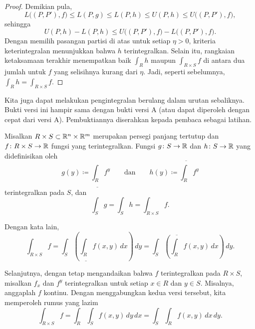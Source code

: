 \begin{proof}
Demikian pula,
\begin{equation*}
L\bigl((P,P'),f\bigr)
\leq
L(P,g) \leq
L(P,h) \leq
U(P,h) \leq
U\bigl((P,P'),f\bigr) ,
\end{equation*}
sehingga
\begin{equation*}
U(P,h) - L(P,h)
\leq
U\bigl((P,P'),f\bigr) -
L\bigl((P,P'),f\bigr) .
\end{equation*}
Dengan memilih pasangan partisi di atas untuk setiap $\eta>0$, kriteria
keterintegralan menunjukkan bahwa $h$ terintegralkan. Selain itu,
rangkaian ketaksamaan terakhir menempatkan baik $\int_R h$ maupun
$\int_{R \times S} f$ di antara dua jumlah untuk $f$ yang selisihnya kurang
dari $\eta$. Jadi, seperti sebelumnya,
$\int_R h = \int_{R \times S} f$.
\end{proof}

Kita juga dapat melakukan pengintegralan berulang dalam urutan sebaliknya.
Bukti versi ini hampir sama dengan bukti versi A
(atau dapat diperoleh dengan cepat dari versi A)\@.
Pembuktiannya diserahkan kepada pembaca sebagai latihan.

\begin{thm}\label{mv:fubinivB}
\pagebreak[2]
Misalkan $R \times S \subset {\mathbb{R}}^n \times {\mathbb{R}}^m$ merupakan persegi panjang
tertutup dan $f \colon R \times S \to {\mathbb{R}}$ fungsi yang terintegralkan.
Fungsi $g \colon S \to {\mathbb{R}}$ dan $h \colon S \to {\mathbb{R}}$ yang didefinisikan oleh
\begin{equation*}
g(y) \coloneqq \underline{\int_R} f^y \qquad
\text{dan} \qquad
h(y) \coloneqq \overline{\int_R} f^y 
\end{equation*}
terintegralkan pada $S$, dan
\begin{equation*}
\int_S g = \int_S h = \int_{R \times S} f .
\end{equation*}
\end{thm}

Dengan kata lain,
\begin{equation*}
\int_{R \times S} f
=
 \int_S \left(
 \underline{\int_R} f(x,y) \, dx
\right) \, dy
=
 \int_S \left(
 \overline{\int_R} f(x,y) \, dx
\right) \, dy .
\end{equation*}

Selanjutnya, dengan tetap mengandaikan bahwa $f$ terintegralkan pada
$R \times S$, misalkan $f_x$ dan $f^y$ terintegralkan untuk setiap $x \in R$
dan $y \in S$. Misalnya, anggaplah $f$ kontinu. Dengan menggabungkan kedua
versi tersebut, kita memperoleh rumus yang lazim
\begin{equation*}
\int_{R \times S} f
=
 \int_R 
 \int_S f(x,y) \, dy \, dx 
=
 \int_S 
 \int_R f(x,y) \, dx \, dy .
\end{equation*}


